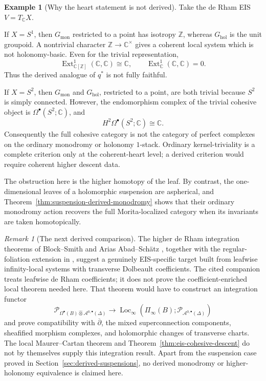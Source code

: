 \documentclass[12pt]{amsart}
\theoremstyle{definition}
\newtheorem{example}[thm]{Example}
\theoremstyle{remark}
\newtheorem{rem}[thm]{Remark}
\numberwithin{equation}{section}
\newcommand{\CA}{\mathcal A}
\newcommand{\C}{\mathbb C}
\newcommand{\delb}{\overline{\partial}}
\newcommand{\ext}{\operatorname{Ext}}
\begin{document}
\begin{example}[Why the heart statement is not derived]
\label{ex:ordinary-groupoid-derived-failure}
Take the de Rham EIS \(V=T_{\C}X\).

If \(X=S^1\), then \(G_{\mathrm{mon}}\) restricted to a point has isotropy
\(\mathbb Z\), whereas \(G_{\mathrm{hol}}\) is the unit groupoid.  A
nontrivial character \(\mathbb Z\to\C^\times\) gives a coherent local system
which is not holonomy-basic.  Even for the trivial representation,
\[
\ext^1_{\C[\mathbb Z]}(\C,\C)\cong\C,
\qquad
\ext^1_{\C}(\C,\C)=0.
\]
Thus the derived analogue of \(q^*\) is not fully faithful.

If \(X=S^2\), then \(G_{\mathrm{mon}}\) and \(G_{\mathrm{hol}}\), restricted
to a point, are both trivial because \(S^2\) is simply connected.  However,
the endomorphism complex of the trivial cohesive object is
\(\Omega^\bullet(S^2;\C)\), and
\[
H^2\Omega^\bullet(S^2;\C)\cong\C.
\]
Consequently the full cohesive category is not the category of perfect
complexes on the ordinary monodromy or holonomy \(1\)-stack.  Ordinary
kernel-triviality is a complete criterion only at the coherent-heart level;
a derived criterion would require coherent higher descent data.

The obstruction here is the higher homotopy of the leaf.  By contrast, the
one-dimensional leaves of a holomorphic suspension are aspherical, and
Theorem~\ref{thm:suspension-derived-monodromy} shows that their ordinary
monodromy action recovers the full Morita-localized category when its
invariants are taken homotopically.
\end{example}

\begin{rem}[The next derived comparison]
\label{rem:transverse-holomorphic-rh}
The higher de Rham integration theorems of Block--Smith and Arias
Abad--Sch\"atz \cite{BlockSmith2014,AriasAbadSchaetz2013}, together with the
regular-foliation extension in \cite{ZengHigherRH}, suggest a genuinely
EIS-specific target built from leafwise infinity-local systems with
transverse Dolbeault coefficients.  The cited companion treats leafwise de
Rham coefficients; it does not prove the coefficient-enriched local theorem
needed here.  That theorem would have to construct an integration functor
\[
\mathcal P_{\Omega^\bullet(B)\widehat\otimes
\CA^{0,\bullet}(\Delta)}
\longrightarrow
\operatorname{Loc}_{\infty}
\left(
\Pi_\infty(B);
\mathcal P_{\CA^{0,\bullet}(\Delta)}
\right)
\]
and prove compatibility with \(\delb\), the mixed superconnection
components, sheafified morphism complexes, and holomorphic changes of
transverse charts.  The local Maurer--Cartan theorem and
Theorem~\ref{thm:eis-cohesive-descent} do not by themselves supply this
integration result.  Apart from the suspension case proved in
Section~\ref{sec:derived-suspensions}, no derived monodromy or
higher-holonomy equivalence is claimed here.
\end{rem}
\end{document}
